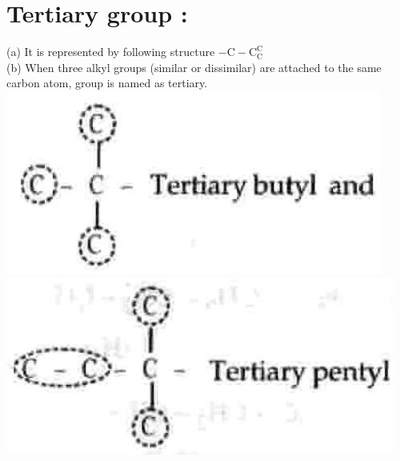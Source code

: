 \documentclass[10pt]{article}
\begin{document}
\section*{Tertiary group :}
(a) It is represented by following structure $-\mathrm{C}-\mathrm{C}_{\mathrm{C}}^{\mathrm{C}}$\\
(b) When three alkyl groups (similar or dissimilar) are attached to the same carbon atom, group is named as tertiary.\\
\includegraphics[max width=\textwidth, center]{2025_01_28_8470952b98110cec3aabg-009(2)}\\
\includegraphics[max width=\textwidth, center]{2025_01_28_8470952b98110cec3aabg-009(3)}
\end{document}
